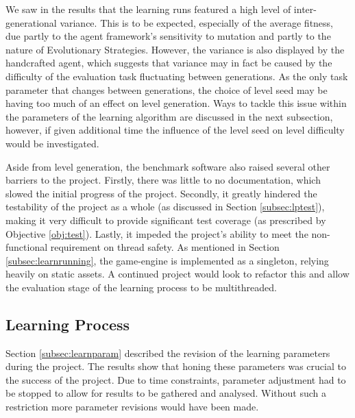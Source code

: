 We saw in the results that the learning runs featured a high level of inter-generational variance. This is to be expected, especially of the average fitness, due partly to the agent framework's sensitivity to mutation and partly to the nature of Evolutionary Strategies. However, the variance is also displayed by the handcrafted agent, which suggests that variance may in fact be caused by the difficulty of the evaluation task fluctuating between generations. As the only task parameter that changes between generations, the choice of level seed may be having too much of an effect on level generation. Ways to tackle this issue within the parameters of the learning algorithm are discussed in the next subsection, however, if given additional time the influence of the level seed on level difficulty would be investigated.

Aside from level generation, the benchmark software also raised several other barriers to the project. Firstly, there was little to no documentation, which slowed the initial progress of the project. Secondly, it greatly hindered the testability of the project as a whole (as discussed in Section \ref{subsec:lptest}), making it very difficult to provide significant test coverage (as prescribed by Objective \ref{obj:test}). Lastly, it impeded the project's ability to meet the non-functional requirement on thread safety. As mentioned in Section \ref{subsec:learnrunning}, the game-engine is implemented as a singleton, relying heavily on static assets. A continued project would look to refactor this and allow the evaluation stage of the learning process to be multithreaded.




\subsection{Learning Process}
\label{subsec:evallearn}

Section \ref{subsec:learnparam} described the revision of the learning parameters during the project. The results show that honing these parameters was crucial to the success of the project. Due to time constraints, parameter adjustment had to be stopped to allow for results to be gathered and analysed. Without such a restriction more parameter revisions would have been made.

